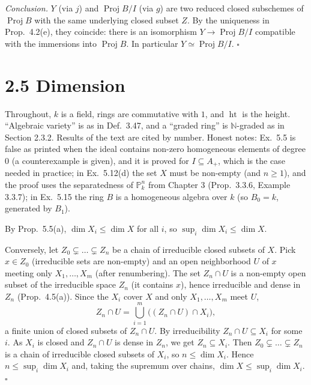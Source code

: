 \documentclass[11pt]{article}
\begin{document}
\emph{Conclusion.} $Y$ (via $j$) and $\operatorname{Proj}B/I$ (via $g$) are two reduced closed subschemes of $\operatorname{Proj}B$ with the same underlying closed subset $Z$. By the uniqueness in Prop.~4.2(e), they coincide: there is an isomorphism $Y\to\operatorname{Proj}B/I$ compatible with the immersions into $\operatorname{Proj}B$. In particular $Y\simeq\operatorname{Proj}B/I$. \hfill$\square$

\section*{2.5 Dimension}

Throughout, $k$ is a field, rings are commutative with $1$, and $\operatorname{ht}$ is the height. ``Algebraic variety'' is as in Def.~3.47, and a ``graded ring'' is $\mathbb N$-graded as in Section 2.3.2. Results of the text are cited by number. Honest notes: Ex.~5.5 is false as printed when the ideal contains non-zero homogeneous elements of degree $0$ (a counterexample is given), and it is proved for $I\subseteq A_+$, which is the case needed in practice; in Ex.~5.12(d) the set $X$ must be non-empty (and $n\ge1$), and the proof uses the separatedness of $\mathbb P^n_k$ from Chapter 3 (Prop.~3.3.6, Example 3.3.7); in Ex.~5.15 the ring $B$ is a homogeneous algebra over $k$ (so $B_0=k$, generated by $B_1$).

\pf
By Prop.~5.5(a), $\dim X_i\le\dim X$ for all $i$, so $\sup_i\dim X_i\le\dim X$.

Conversely, let $Z_0\subsetneq\dots\subsetneq Z_n$ be a chain of irreducible closed subsets of $X$. Pick $x\in Z_0$ (irreducible sets are non-empty) and an open neighborhood $U$ of $x$ meeting only $X_1,\dots,X_m$ (after renumbering). The set $Z_n\cap U$ is a non-empty open subset of the irreducible space $Z_n$ (it contains $x$), hence irreducible and dense in $Z_n$ (Prop.~4.5(a)). Since the $X_i$ cover $X$ and only $X_1,\dots,X_m$ meet $U$,
\[ Z_n\cap U=\bigcup_{i=1}^m\bigl((Z_n\cap U)\cap X_i\bigr), \]
a finite union of closed subsets of $Z_n\cap U$. By irreducibility $Z_n\cap U\subseteq X_i$ for some $i$. As $X_i$ is closed and $Z_n\cap U$ is dense in $Z_n$, we get $Z_n\subseteq X_i$. Then $Z_0\subsetneq\dots\subsetneq Z_n$ is a chain of irreducible closed subsets of $X_i$, so $n\le\dim X_i$. Hence $n\le\sup_i\dim X_i$ and, taking the supremum over chains, $\dim X\le\sup_i\dim X_i$. \hfill$\square$
\end{document}
